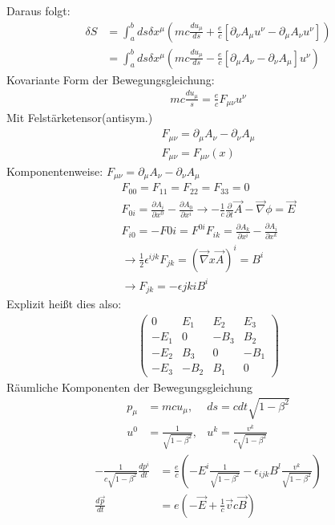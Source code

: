 \documentclass[a4paper]{article}
\begin{document}
Daraus folgt:
\begin{align}
\delta S &= \int_a^b ds \delta x^\mu \left( mc\frac{du_\mu}{ds} +
\frac{e}{c} \left[ \partial_\nu A_\mu u^\nu - \partial_\mu A_\nu u^\nu
\right]\right)\\
&=\int_a^b ds \delta x^\mu \left( mc\frac{du_\mu}{ds} -
\frac{e}{c} \left[ \partial_\mu A_\nu - \partial_\nu A_\mu \right] u^\nu
\right)
\end{align}
Kovariante Form der Bewegungsgleichung:
\begin{align}
mc\frac{du_\mu}{s}=\frac{e}{c}F_{\mu\nu}u^\nu
\end{align}
Mit Felstärketensor(antisym.)
\begin{align}
F_{\mu\nu}=\partial_\mu A_\nu - \partial_\nu A_\mu\\
F_{\mu\nu}=F_{\mu\nu}(x)
\end{align}
Komponentenweise: $F_{\mu\nu}=\partial_\mu A_\nu - \partial_\nu A_\mu$\\
\begin{align}
F_{00}=F_{11}=F_{22}=F_{33}=0\\
F_{0i}=\frac{\partial A_i}{\partial x^0}-\frac{\partial A_0}{\partial x^i}
\rightarrow -\frac{1}{c}\frac{\partial}{\partial
t}\vec{A}-\vec{\nabla}\phi=\vec{E}\\
F_{i0}=-F{0i}=F^{0i}
F_{ik}=\frac{\partial A_k}{\partial x^i}-\frac{\partial A_i}{\partial x^k}\\
\rightarrow \frac{1}{2}\epsilon^{ijk}F_{jk}=(\vec{\nabla}x\vec{A})^i=B^i\\
\rightarrow F_{jk}=-\epsilon{jki}B^i
\end{align}
Explizit heißt dies also:
\begin{align}
\begin{pmatrix}
0 & E_1 & E_2 & E_3\\
-E_1 &0&-B_3&B_2 \\
-E_2 &B_3&0&-B_1\\
-E_3 &-B_2&B_1&0
\end{pmatrix}
\end{align}
Räumliche Komponenten der Bewegungsgleichung
\begin{align}
p_\mu&=mcu_\mu , &ds=cdt\sqrt{1-\beta^2}\\
u^0&=\frac{1}{\sqrt{1-\beta^2}} , &u^k=\frac{v^k}{c\sqrt{1-\beta^2}}
\end{align}
\begin{align}
-\frac{1}{c\sqrt{1-\beta^2}}\frac{dp^i}{dt}&=\frac{e}{c}\left(-E^i
\frac{1}{\sqrt{1-\beta^2}}-\epsilon_{ijk}B^l\frac{v^k}{\sqrt{1-\beta^2}}\right)\\
\frac{d\vec{p}}{dt}&=e\left(-\vec{E}+\frac{1}{c}\vec{v}c\vec{B}\right)
\end{align}
\end{document}
